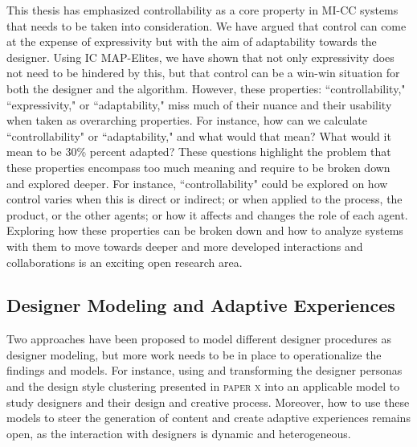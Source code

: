 This thesis has emphasized controllability as a core property in MI-CC systems that needs to be taken into consideration. We have argued that control can come at the expense of expressivity but with the aim of adaptability towards the designer. Using IC MAP-Elites, we have shown that not only expressivity does not need to be hindered by this, but that control can be a win-win situation for both the designer and the algorithm. However, these properties: ``controllability," ``expressivity," or ``adaptability," miss much of their nuance and their usability when taken as overarching properties. For instance, how can we calculate ``controllability" or ``adaptability," and what would that mean? What would it mean to be 30\% percent adapted? These questions highlight the problem that these properties encompass too much meaning and require to be broken down and explored deeper. For instance, ``controllability" could be explored on how control varies when this is direct or indirect; or when applied to the process, the product, or the other agents; or how it affects and changes the role of each agent. Exploring how these properties can be broken down and how to analyze systems with them to move towards deeper and more developed interactions and collaborations is an exciting open research area.



\subsection{Designer Modeling and Adaptive Experiences}


Two approaches have been proposed to model different designer procedures as designer modeling, but more work needs to be in place to operationalize the findings and models. For instance, using and transforming the designer personas and the design style clustering
presented in \textsc{paper x} into an applicable model to study designers and their design and creative process. Moreover, how to use these models to steer the generation of content and create adaptive experiences remains open, as the interaction with designers is dynamic and heterogeneous.

